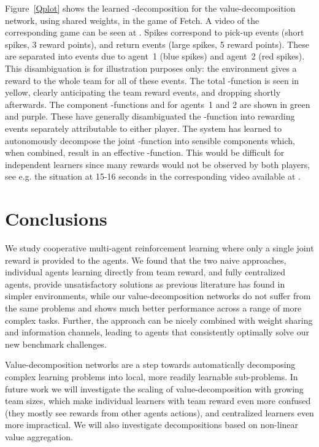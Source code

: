 \documentclass{article}
\begin{document}
\begin{SCfigure}
Figure~\ref{Qplot} shows the learned -decomposition for the value-decomposition network, using shared weights, in the game of Fetch. A video of the corresponding game can be seen at \citet{B17}. Spikes correspond to pick-up events (short spikes, 3 reward points), and return events (large spikes, 5 reward points). These are separated into events due to agent~1 (blue spikes) and agent~2 (red spikes). This disambiguation is for illustration purposes only: the environment gives a reward to the whole team for all of these events. The total -function is seen in yellow, clearly anticipating the team reward events, and dropping shortly afterwards. The component -functions  and  for agents~1 and 2 are shown in green and purple. These have generally disambiguated the -function into rewarding events separately attributable to either player. The system has learned to autonomously decompose the joint -function into sensible components which, when combined, result in an effective -function. This would be difficult for independent learners since many rewards would not be observed by both players, see e.g. the situation at 15-16 seconds in the corresponding video available at \citet{B17}.


















\section{Conclusions}
We study cooperative multi-agent reinforcement learning where only a single joint reward is provided to the agents. We found that the two naive approaches, individual agents learning directly from team reward, and fully centralized agents, provide unsatisfactory solutions as previous literature has found in simpler environments, while our value-decomposition networks do not suffer from the same problems and shows much better performance across a range of more complex tasks. Further, the approach can be nicely combined with weight sharing and information channels, leading to agents that consistently optimally solve our new benchmark challenges. 





Value-decomposition networks are a step towards automatically decomposing complex learning problems into local, more readily learnable sub-problems. In future work we will investigate the scaling of value-decomposition with growing team sizes, which make individual learners with team reward even more confused (they mostly see rewards from other agents actions), and centralized learners even more impractical. We will also investigate decompositions based on non-linear value aggregation.


\end{SCfigure}
\end{document}
